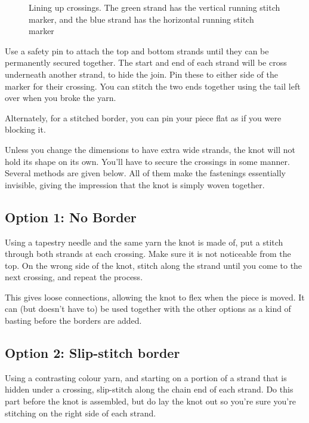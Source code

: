\documentclass[openany]{book}
\begin{document}
\begin{figure}[H]\centering
{}
\caption[Lining up Crossings]{Lining up crossings. The green strand has the vertical running stitch marker, and the blue strand has the horizontal running stitch marker}
\end{figure}

Use a safety pin to attach the top and bottom strands until they can be permanently secured together. The start and end of each strand will be cross underneath another strand, to hide the join. Pin these to either side of the marker for their crossing. You can stitch the two ends together using the tail left over when you broke the yarn.

Alternately, for a stitched border, you can pin your piece flat as if you were blocking it.

Unless you change the dimensions to have extra wide strands, the knot will not hold its shape on its own. You'll have to secure the crossings in some manner. Several methods are given below. All of them make the fastenings essentially invisible, giving the impression that the knot is simply woven together.

\subsection*{Option 1: No Border} Using a tapestry needle and the same yarn the knot is made of, put a stitch through both strands at each crossing. Make sure it is not noticeable from the top. On the wrong side of the knot, stitch along the strand until you come to the next crossing, and repeat the process.

This gives loose connections, allowing the knot to flex when the piece is moved. It can (but doesn't have to) be used together with the other options as a kind of basting before the borders are added.

\subsection*{Option 2: Slip-stitch border} Using a contrasting colour yarn, and starting on a portion of a strand that is hidden under a crossing, slip-stitch along the chain end of each strand. Do this part before the knot is assembled, but do lay the knot out so you're sure you're stitching on the right side of each strand.
\end{document}

